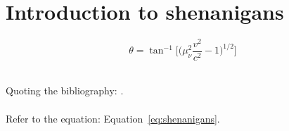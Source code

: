 \documentclass[1-ambra-tesi.tex]{subfiles}
\begin{document}
\label{sec:intro}

\begin{chapabstract}
\small{\lipsum[1]}\\

\begin{center}
    \noindent\makebox[0.8\linewidth]{\rule{0.8\paperwidth}{0.4pt}}
\end{center}
\vspace{2cm}
\end{chapabstract}

\lipsum[2]

\section{Introduction to shenanigans}
\label{sec:shenanigans}
\lipsum[3]
\lipsum[4]

\begin{equation}
    \theta = \tan^{-1} \Big[\Big(\mu_{\nu}^2 \frac{v^2}{c^2} -1 \Big)^{1/2}\Big]
\label{eq:shenanigans}
\end{equation}

\lipsum[5]\\


Quoting the bibliography: \cite{keyword}.\\


\lipsum[6]\\

Refer to the equation: Equation~\ref{eq:shenanigans}.\\

\lipsum[7]
\end{document}
